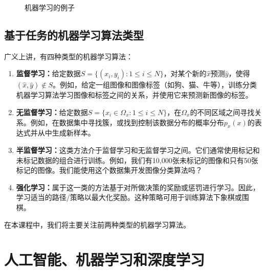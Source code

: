 \begin{figure}[H]
\centering
\caption{机器学习的例子}
\label{fig:ml_examples}
\end{figure}

\subsection{基于任务的机器学习算法类型}
\label{subsec:ml_types}

广义上讲，有四种类型的机器学习算法：

\begin{enumerate}
\item \textbf{监督学习：}给定数据$S = \{(x_i, y_i) : 1 \leq i \leq N\}$，对某个新的$\hat{x}$预测$\hat{y}$，使得$(\hat{x}, \hat{y}) \notin S$。例如，给定一组图像和图像标签（如狗、猫、牛等），训练分类机器学习算法学习图像和标签之间的关系，并使用它来预测新图像的标签。

\item \textbf{无监督学习：}给定数据$S = \{x_i \in \Omega_x : 1 \leq i \leq N\}$，在$\Omega_x$的不同区域之间寻找关系。例如，在数据集中寻找簇，或找到控制该数据分布的概率分布$p_x(x)$的表达式并从中生成新样本。

\item \textbf{半监督学习：}这类方法介于监督学习和无监督学习之间。它们通常使用标记和未标记数据的组合进行训练。例如，我们有10,000张未标记的图像和只有50张标记的图像。我们能使用这个数据集开发图像分类算法吗？

\item \textbf{强化学习：}属于这一类的方法基于对所做决策的奖励或惩罚进行学习。因此，学习适当的路径/策略以最大化奖励。这种策略可用于训练算法下象棋或围棋。
\end{enumerate}

在本课程中，我们将主要关注前两种类型的机器学习算法。

\section{人工智能、机器学习和深度学习}
\label{sec:ai_ml_dl}

